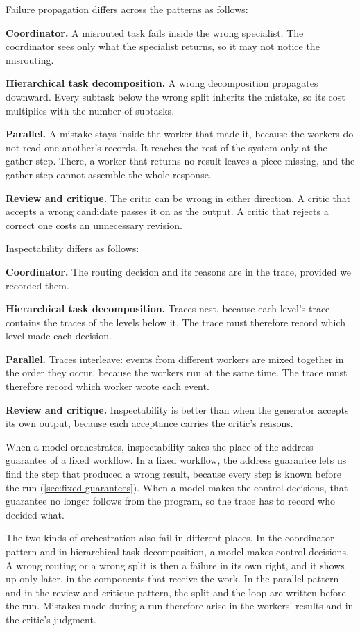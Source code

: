 Failure propagation differs across the patterns as follows:
\bi
\item \textbf{Coordinator.} A misrouted task fails inside the wrong specialist. The coordinator sees
only what the specialist returns, so it may not notice the misrouting.
\item \textbf{Hierarchical task decomposition.} A wrong decomposition propagates downward. Every
subtask below the wrong split inherits the mistake, so its cost multiplies with the number of
subtasks.
\item \textbf{Parallel.} A mistake stays inside the worker that made it, because the workers do not
read one another's records. It reaches the rest of the system only at the gather step. There, a
worker that returns no result leaves a piece missing, and the gather step cannot assemble the whole
response.
\item \textbf{Review and critique.} The critic can be wrong in either direction. A critic that
accepts a wrong candidate passes it on as the output. A critic that rejects a correct one costs an
unnecessary revision.
\ei

Inspectability differs as follows:
\bi
\item \textbf{Coordinator.} The routing decision and its reasons are in the trace, provided we
recorded them.
\item \textbf{Hierarchical task decomposition.} Traces nest, because each level's trace contains the
traces of the levels below it. The trace must therefore record which level made each decision.
\item \textbf{Parallel.} Traces interleave: events from different workers are mixed together in the
order they occur, because the workers run at the same time. The trace must therefore record which
worker wrote each event.
\item \textbf{Review and critique.} Inspectability is better than when the generator accepts its
own output, because each acceptance carries the critic's reasons.
\ei

When a model orchestrates, inspectability takes the place of the address guarantee of a fixed
workflow. In a fixed workflow, the address guarantee lets us find the step that produced a wrong
result, because every step is known before the run (\cref{sec:fixed-guarantees}). When a model
makes the control decisions, that guarantee no longer follows from the program, so the trace has to
record who decided what.

The two kinds of orchestration also fail in different places. In the coordinator pattern and in
hierarchical task decomposition, a model makes control decisions. A wrong routing or a wrong split
is then a failure in its own right, and it shows up only later, in the components that receive the
work. In the parallel pattern and in the review and critique pattern, the split and the loop are
written before the run. Mistakes made during a run therefore arise in the workers' results and in
the critic's judgment.

